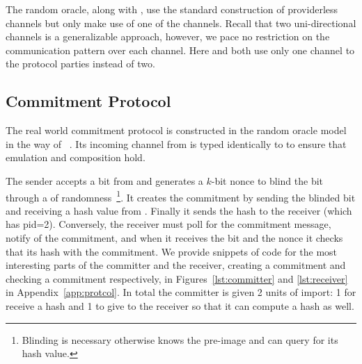 The random oracle, along with \Fcom, use the standard construction of providerless channels but only make use of one of the channels. Recall that two uni-directional channels is a generalizable approach, however, we pace no restriction on the communication pattern over each channel.
Here \Fcom and \Fro both use only one channel to the protocol parties instead of two.

\subsection{Commitment Protocol}
The real world commitment protocol is constructed in the random oracle model in the way of ~\cite{hofheinzcommitment}.
Its incoming channel from \Z is typed identically to \Fcom to ensure that emulation and composition hold.

The sender accepts a bit from \Z and generates a $k$-bit nonce to blind the bit through a  of randomness~\footnote{Blinding is necessary otherwise \A knows the pre-image and can query \Fro for its hash value.}. 
It creates the commitment by sending \Fropp the blinded bit and receiving a hash value from .
Finally it sends the hash to the receiver (which has pid=2).
Conversely, the receiver must poll \Fropp for the commitment  message, notify \Z of the commitment, and when it receives the bit and the nonce it checks that its hash with the commitment.
We provide snippets of code for the most interesting parts of the committer and the receiver, creating a commitment and checking a commitment respectively, in Figures~\ref{lst:committer} and \ref{lst:receiver} in Appendix~\ref{app:protcol}.
In total the committer is given 2 units of import: 1 for receive a hash and 1 to give to the receiver so that it can compute a hash as well.

